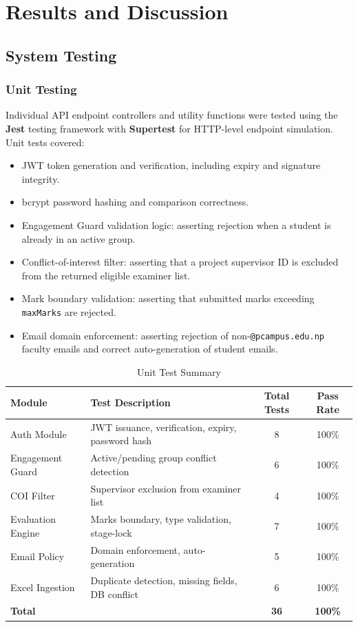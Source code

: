 \chapter{Results and Discussion}

\section{System Testing}

\subsection{Unit Testing}
Individual API endpoint controllers and utility functions were tested using the \textbf{Jest} testing framework with \textbf{Supertest} for HTTP-level endpoint simulation. Unit tests covered:
\begin{itemize}
    \item JWT token generation and verification, including expiry and signature integrity.
    \item bcrypt password hashing and comparison correctness.
    \item Engagement Guard validation logic: asserting rejection when a student is already in an active group.
    \item Conflict-of-interest filter: asserting that a project supervisor ID is excluded from the returned eligible examiner list.
    \item Mark boundary validation: asserting that submitted marks exceeding \texttt{maxMarks} are rejected.
    \item Email domain enforcement: asserting rejection of non-\texttt{@pcampus.edu.np} faculty emails and correct auto-generation of student emails.
\end{itemize}

\begin{table}[H]
\centering
\small
\caption{Unit Test Summary}
\label{tab:unit_tests}
\vspace{6pt}
\begin{tabularx}{\textwidth}{|l|X|c|c|}
\hline
\textbf{Module} & \textbf{Test Description} & \textbf{Total Tests} & \textbf{Pass Rate} \\
\hline
Auth Module & JWT issuance, verification, expiry, password hash & 8 & 100\% \\
Engagement Guard & Active/pending group conflict detection & 6 & 100\% \\
COI Filter & Supervisor exclusion from examiner list & 4 & 100\% \\
Evaluation Engine & Marks boundary, type validation, stage-lock & 7 & 100\% \\
Email Policy & Domain enforcement, auto-generation & 5 & 100\% \\
Excel Ingestion & Duplicate detection, missing fields, DB conflict & 6 & 100\% \\
\hline
\textbf{Total} & & \textbf{36} & \textbf{100\%} \\
\hline
\end{tabularx}
\end{table}

